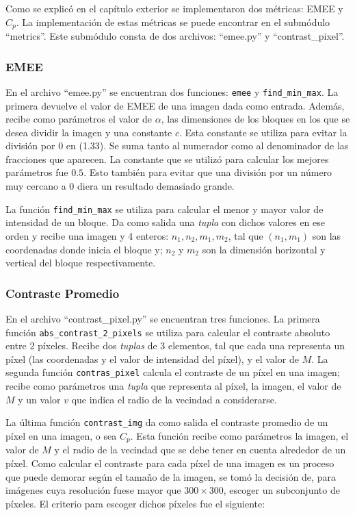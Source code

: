 Como se explic\'o en el cap\'itulo exterior se implementaron dos m\'etricas: EMEE y $C_p$. La implementaci\'on de estas m\'etricas se puede encontrar en el subm\'odulo ``metrics''. Este subm\'odulo consta de dos archivos: ``emee.py'' y ``contrast\_pixel''. 

\subsubsection{EMEE}
En el archivo ``emee.py'' se encuentran dos funciones: \verb|emee| y \verb|find_min_max|. La primera devuelve el valor de EMEE de una imagen dada como entrada. Adem\'as, recibe como par\'ametros el valor de $\alpha$, las dimensiones de los bloques en los que se desea dividir la imagen y una constante $c$. Esta constante se utiliza para evitar la divisi\'on por $0$ en (1.33). Se suma tanto al numerador como al denominador de las fracciones que aparecen. La constante que se utiliz\'o para calcular los mejores par\'ametros fue $0.5$. Esto tambi\'en para evitar que una divisi\'on por un n\'umero muy cercano a 0 diera un resultado demasiado grande. 

La funci\'on \verb|find_min_max| se utiliza para calcular el menor y mayor valor de intensidad de un bloque. Da como salida una \textit{tupla} con dichos valores en ese orden y recibe una imagen y 4 enteros: $n_1,n_2,m_1,m_2$, tal que $(n_1,m_1)$ son las coordenadas donde inicia el bloque y; $n_2$ y $m_2$ son la dimensi\'on horizontal y vertical del bloque respectivamente.

\subsubsection{Contraste Promedio}
En el archivo ``contrast\_pixel.py'' se encuentran tres funciones. La primera funci\'on \verb|abs_contrast_2_pixels| se utiliza para calcular el contraste absoluto entre 2 p\'ixeles. Recibe dos \textit{tuplas} de 3 elementos, tal que cada una representa un p\'ixel (las coordenadas y el valor de intensidad del p\'ixel), y el valor de $M$. La segunda funci\'on \verb|contras_pixel| calcula el contraste de un p\'ixel en una imagen; recibe como par\'ametros una \textit{tupla} que representa al p\'ixel, la imagen, el valor de $M$ y un valor $v$ que indica el radio de la vecindad a considerarse. 

La \'ultima funci\'on \verb|contrast_img| da como salida el contraste promedio de un p\'ixel en una imagen, o sea $C_p$. Esta funci\'on recibe como par\'ametros la imagen, el valor de $M$ y el radio de la vecindad que se debe tener en cuenta alrededor de un p\'ixel. Como calcular el contraste para cada p\'ixel de una imagen es un proceso que puede demorar seg\'un el tama\~no de la imagen, se tom\'o la decisi\'on de, para im\'agenes cuya resoluci\'on fuese mayor que $300\times300$, escoger un subconjunto de p\'ixeles. El criterio para escoger dichos p\'ixeles fue el siguiente:

